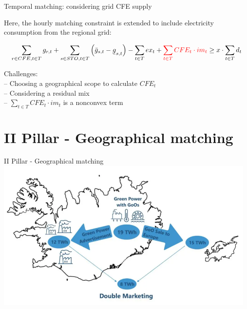 \begin{frame}{Temporal matching: considering grid CFE supply}

  Here, the \alert{hourly matching constraint} is extended to include electricity consumption from the regional grid:

  \vspace{0.1cm}
  \begin{equation*}
  \sum_{r\in CFE, t\in T} g_{r,t} + \sum_{s\in STO, t\in T} \left(\bar{g}_{s,t} - \ubar{g}_{s,t}\right) - \sum_{t\in T} ex_t + \textcolor{red}{\sum_{t\in T} CFE_t \cdot im_t} \geq x \cdot \sum_{t\in T} d_t
  \label{eqn:CFE}
  \end{equation*}
  \vspace{0.1cm}

  \noindent{}
    
    Challenges:\\
    -- Choosing a \alert{geographical scope} to calculate  $CFE_t$\\
    -- Considering a \alert{residual mix} \\
    -- $\sum_{t\in T} CFE_t \cdot im_t$ is a \alert{nonconvex term}

\end{frame}


\section{II Pillar - Geographical matching}
\begin{frame}{II Pillar - Geographical matching}
  \includegraphics[width=13cm]{images/go_leak.png}
\end{frame}



